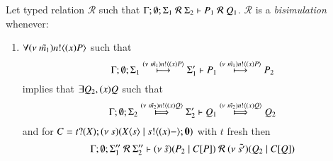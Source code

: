 \begin{definition}[Bisimulation]\rm
	Let typed relation $\mathcal{R}$ such that $\Gamma; \emptyset; \Sigma_1\ \mathcal{R}\ \Sigma_2 \proves P_1\ \mathcal{R}\ Q_1$.
	$\mathcal{R}$ is a {\em bisimulation} whenever:
	\begin{enumerate}
		\item	$\forall (\nu\ \tilde{m_1}) n ! \langle (x)P \rangle$ such that
			\[
				\Gamma; \emptyset; \Sigma_1 \stackrel{(\nu\ \tilde{m_1}) n ! \langle (x)P \rangle}{\longmapsto} \Sigma_1' \vdash P_1 \stackrel{(\nu\ \tilde{m_1}) n ! \langle (x)P \rangle}{\longmapsto} P_2
			\]
			implies that $\exists Q_2, (x)Q$ such that
			\[
				\Gamma; \emptyset; \Sigma_2 \Hby{\news{\tilde{m_2}} \bactout{n}{\abs{x} Q}} \Sigma_2' \proves Q_1 \Hby{\news{\tilde{m_2}} \bactout{n}{\abs{x} Q}} Q_2
			\]
			and for $C = t ? (X) ; (\nu\ s)(X\langle s \rangle \;|\; s ! \langle (x)- \rangle ; \mathbf{0})$ with $t$ fresh
			then
			\[
				\Gamma; \emptyset; \Sigma_1''\ \mathcal{R}\ \Sigma_2'' \proves
				\newsp{\tilde{s}}{P_2 \Par \context{C}{P}}
				\ \mathcal{R}\ 
				\newsp{\tilde{s'}}{Q_2 \Par \context{C}{Q}}
			\]



\end{enumerate}
\end{definition}
